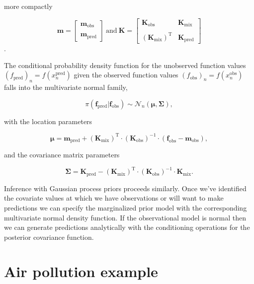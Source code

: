 \documentclass[a4paper, 10pt, fleqn]{article}
\begin{document}
\begin{flushleft}
   more compactly

   \vspace{1em}

   $$\mathbf{m} = 
   \begin{bmatrix}
      \mathbf{m}_{\text{obs}} \\
      \\
      \mathbf{m}_{\text{pred}}
   \end{bmatrix}  
   \: 
   \text{and}
   \:
   \mathbf{K} = 
   \begin{bmatrix}
      \mathbf{K}_{\text{obs}} & \mathbf{K}_{\text{mix}} \\
      \\
      (\mathbf{K}_{\text{mix}})^{\text{T}} & \mathbf{K}_{\text{pred}}
   \end{bmatrix}$$.

   \vspace{1em}

   The conditional probability density function for the unobserved function values $(f_{\text{pred}})_{n} = f(x_{n}^{\text{pred}})$ given the observed function values  $(f_{\text{obs}})_{n} = f(x_{n}^{\text{obs}})$ falls into the multivariate normal family,

   $$\pi(\mathbf{f}_{\text{pred}} | \mathbf{f}_{\text{obs}}) \sim \mathcal{N}_{n}(\boldsymbol{\mu}, \boldsymbol{\Sigma}),$$

   with the location parameters 

   $$\boldsymbol{\mu} = \mathbf{m}_{\text{pred}} + (\mathbf{K}_{\text{mix}})^{\text{T}} \cdot (\mathbf{K}_{\text{obs}})^{-1} \cdot (\mathbf{f}_{\text{obs}} - \mathbf{m}_{\text{obs}}),$$

   and the covariance matrix parameters

   $$\boldsymbol{\Sigma} = \mathbf{K}_{\text{pred}} - (\mathbf{K}_{\text{mix}})^{\text{T}} \cdot (\mathbf{K}_{\text{obs}})^{-1} \cdot \mathbf{K}_{\text{mix}}.$$

   Inference with Gaussian process priors proceeds similarly. Once we've identified the covariate values at which we have observations or will want to make predictions we can specify the marginalized prior model with the corresponding multivariate normal density function. If the observational model is normal then we can generate predictions analytically with the conditioning operations for the posterior covariance function.

   \section*{Air pollution example}

\end{flushleft}
\end{document}
